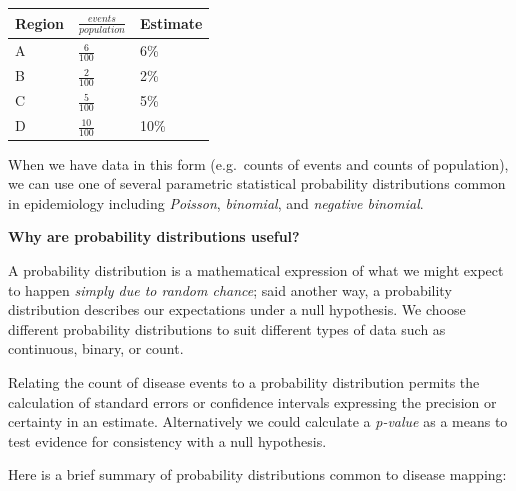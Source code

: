 \documentclass[
]{book}
\newenvironment{rmdnote}[1]
  {
  \begin{itemize}
  \renewcommand{\labelitemi}{
    \raisebox{-.7\height}[0pt][0pt]{
      {\setkeys{Gin}{width=3em,keepaspectratio}\texttt{[image: images/\#1]}}
    }
  }
  \setlength{\fboxsep}{1em}
  \begin{note}
  \item
  }
  {
  \end{note}
  \end{itemize}
  }
\begin{document}
\begin{longtable}[]{@{}lll@{}}
\toprule()
Region & \(\frac{events}{population}\) & Estimate \\
\midrule()
\endhead
A & \(\frac{6}{100}\) & 6\% \\
B & \(\frac{2}{100}\) & 2\% \\
C & \(\frac{5}{100}\) & 5\% \\
D & \(\frac{10}{100}\) & 10\% \\
\bottomrule()
\end{longtable}

When we have data in this form (e.g.~counts of events and counts of population), we can use one of several parametric statistical probability distributions common in epidemiology including \emph{Poisson}, \emph{binomial}, and \emph{negative binomial}.

\begin{rmdnote}{note}
\textbf{Why are probability distributions useful?}

A probability distribution is a mathematical expression of what we might expect to happen \emph{simply due to random chance}; said another way, a probability distribution describes our expectations under a null hypothesis. We choose different probability distributions to suit different types of data such as continuous, binary, or count.

Relating the count of disease events to a probability distribution permits the calculation of standard errors or confidence intervals expressing the precision or certainty in an estimate. Alternatively we could calculate a \emph{p-value} as a means to test evidence for consistency with a null hypothesis.

\end{rmdnote}

Here is a brief summary of probability distributions common to disease mapping:
\end{document}
